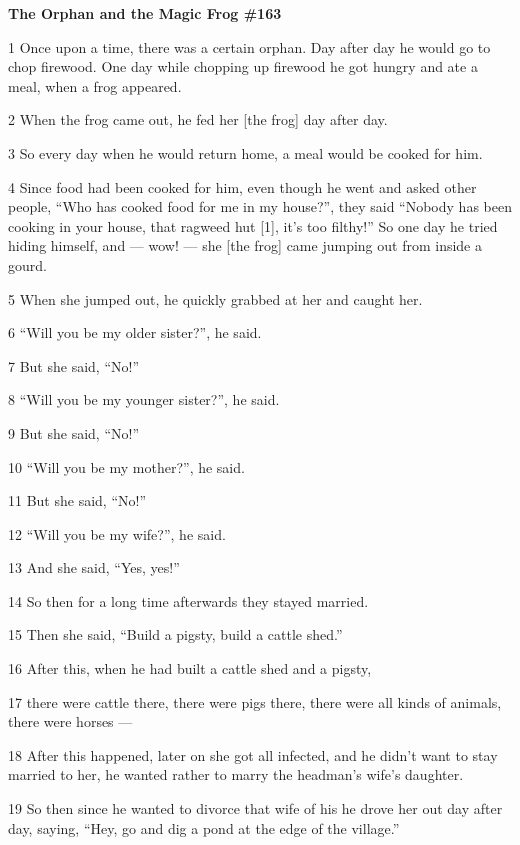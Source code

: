 
{\LARGE{}\textbf{The Orphan and the Magic Frog  \#163}}

{\LARGE{}1 Once upon a time, there was a certain orphan. Day after day he would
go to chop firewood. One day while chopping up firewood he got hungry and ate a
meal, when a frog appeared.}

{\LARGE{}2 When the frog came out, he fed her [the frog] day after day.}

{\LARGE{}3 So every day when he would return home, a meal would be cooked for him.}

{\LARGE{}4 Since food had been cooked for him, even though he went and asked other
people, ``Who has cooked food for me in my house?'', they said ``Nobody has been
cooking in your house, that ragweed hut [1], it's too filthy!'' So one day he tried
hiding himself, and --- wow! --- she [the frog] came jumping out from inside a
gourd.}

{\LARGE{}5 When she jumped out, he quickly grabbed at her and caught her.}

{\LARGE{}6 ``Will you be my older sister?'', he said.}

{\LARGE{}7 But she said, ``No!''}

{\LARGE{}8 ``Will you be my younger sister?'', he said.}

{\LARGE{}9 But she said, ``No!''}

{\LARGE{}10 ``Will you be my mother?'', he said.}

{\LARGE{}11 But she said, ``No!''}

{\LARGE{}12 ``Will you be my wife?'', he said.}

{\LARGE{}13 And she said, ``Yes, yes!''}

{\LARGE{}14 So then for a long time afterwards they stayed married.}

{\LARGE{}15 Then she said, ``Build a pigsty, build a cattle shed.''}

{\LARGE{}16 After this, when he had built a cattle shed and a pigsty,}

{\LARGE{}17 there were cattle there, there were pigs there, there were all kinds
of animals, there were horses ---}

{\LARGE{}18 After this happened, later on she got all infected, and he didn't want
to stay married to her, he wanted rather to marry the headman's wife's daughter.}

{\LARGE{}19 So then since he wanted to divorce that wife of his he drove her out
day after day, saying, ``Hey, go and dig a pond at the edge of the village.''}

